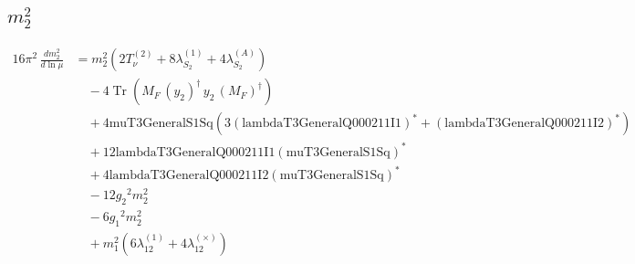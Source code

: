 \documentclass[10pt,a4paper]{article}
\begin{document}
\subsection*{$m_2^2$}
\begin{align*}
16\pi^2\,\frac{d m_2^2}{d\ln\mu} &={m_2^2} (2 T_{\nu}^{(2)}+8 {\lambda_{S_2}^{(1)}}+4 {\lambda_{S_2}^{(A)}}) \\
&\quad -4 \operatorname{Tr}\!\left({M_F}\,\left({y_2}\right)^{\dagger}\,{y_2}\,\left({M_F}\right)^{\dagger}\right) \\
&\quad +4 \text{muT3GeneralS1Sq} (3 \left(\text{lambdaT3GeneralQ000211I1}\right)^{*}+\left(\text{lambdaT3GeneralQ000211I2}\right)^{*}) \\
&\quad +12 \text{lambdaT3GeneralQ000211I1} \left(\text{muT3GeneralS1Sq}\right)^{*} \\
&\quad +4 \text{lambdaT3GeneralQ000211I2} \left(\text{muT3GeneralS1Sq}\right)^{*} \\
&\quad -12 {g_2}^2 {m_2^2} \\
&\quad -6 {g_1}^2 {m_2^2} \\
&\quad +{m_1^2} (6 {\lambda_{12}^{(1)}}+4 {\lambda_{12}^{(\times)}}) \\
\end{align*}
\end{document}
